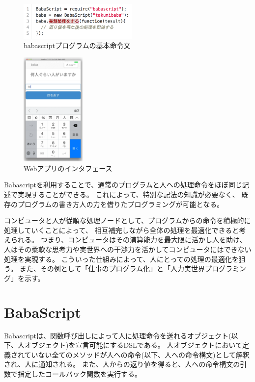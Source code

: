 \begin{figure}[h]
  \centering
  \includegraphics[width=220px]{./images/script_01.png}
  \caption{babascriptプログラムの基本命令文}
  \label{script_01}
\end{figure}

\begin{figure}[h]
  \centering
  \includegraphics[width=120px]{./images/interface.png}
  \caption{Webアプリのインタフェース}
  \label{webapp-interface}
\end{figure}

Babascriptを利用することで、通常のプログラムと人への処理命令をほぼ同じ記述で実現することができる。
これによって、特別な記法の知識が必要なく、
既存のプログラムの書き方人の力を借りたプログラミングが可能となる。

コンピュータと人が従順な処理ノードとして、プログラムからの命令を積極的に処理していくことによって、
相互補完しながら全体の処理を最適化できると考えられる。
つまり、コンピュータはその演算能力を最大限に活かし人を助け、
人はその柔軟な思考力や実世界への干渉力を活かしてコンピュータにはできない処理を実現する。
こういった仕組みによって、人にとっての処理の最適化を狙う。
また、その例として「仕事のプログラム化」と「人力実世界プログラミング」を示す。

\section{BabaScript}\label{babascript}

Babascriptは、関数呼び出しによって人に処理命令を送れるオブジェクト(以下、人オブジェクト)を宣言可能にするDSLである。
人オブジェクトにおいて定義されていない全てのメソッドが人への命令(以下、人への命令構文)として解釈され、人に通知される。
また、人からの返り値を得ると、人への命令構文の引数で指定したコールバック関数を実行する。

